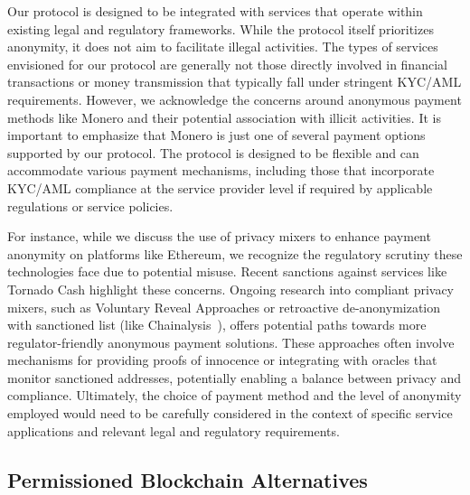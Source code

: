 \documentclass[pdftex,twocolumn,epjc3]{svjour3}
\begin{document}
\begin{sloppypar}
Our protocol is designed to be integrated with services that operate within existing legal and regulatory frameworks.  While the protocol itself prioritizes anonymity, it does not aim to facilitate illegal activities.  The types of services envisioned for our protocol are generally not those directly involved in financial transactions or money transmission that typically fall under stringent KYC/AML requirements. However, we acknowledge the concerns around anonymous payment methods like Monero and their potential association with illicit activities. It is important to emphasize that Monero is just one of several payment options supported by our protocol. The protocol is designed to be flexible and can accommodate various payment mechanisms, including those that incorporate KYC/AML compliance at the service provider level if required by applicable regulations or service policies.
\end{sloppypar}

\begin{sloppypar}
For instance, while we discuss the use of privacy mixers to enhance payment anonymity on platforms like Ethereum, we recognize the regulatory scrutiny these technologies face due to potential misuse.  Recent sanctions against services like Tornado Cash highlight these concerns. Ongoing research into compliant privacy mixers, such as Voluntary Reveal Approaches or retroactive de-anonymization~\cite{baranskiHazeDazeCompliant2023} with sanctioned list (like Chainalysis~\cite{chainalysisChainalysisOracleSanctions}), offers potential paths towards more regulator-friendly anonymous payment solutions. These approaches often involve mechanisms for providing proofs of innocence or integrating with oracles that monitor sanctioned addresses, potentially enabling a balance between privacy and compliance.  Ultimately, the choice of payment method and the level of anonymity employed would need to be carefully considered in the context of specific service applications and relevant legal and regulatory requirements.
\end{sloppypar}

\subsection{Permissioned Blockchain Alternatives}
\end{document}
